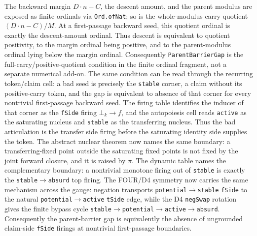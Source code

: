 \begin{theorem}
  \leanok
  The backward margin \(D\cdot n-C\), the descent amount, and the parent modulus
  are exposed as finite ordinals via \texttt{Ord.ofNat}; so is the whole-modulus
  carry quotient \((D\cdot n-C)/M\). At a first-passage backward seed, this
  quotient ordinal is exactly the descent-amount ordinal. Thus descent is
  equivalent to quotient positivity, to the margin ordinal being positive, and to
  the parent-modulus ordinal lying below the margin ordinal. Consequently
  \texttt{ParentBarrierGap} is the full-carry/positive-quotient condition in the
  finite ordinal fragment, not a separate numerical add-on. The same condition
  can be read through the recurring token/claim cell: a bad seed is precisely the
  \texttt{stable} corner, a claim without its positive-carry token, and the gap is
  equivalent to absence of that corner for every nontrivial first-passage
  backward seed. The firing table identifies the inducer of that corner as the
  \texttt{fSide} firing \(\bot_k\to f\), and the autopoiesis cell reads
  \texttt{active} as the saturating nucleus and \texttt{stable} as the transferring
  nucleus. Thus the bad articulation is the transfer side firing before the
  saturating identity side supplies the token. The abstract nuclear theorem now
  names the same boundary: a transferring-fixed point outside the saturating
  fixed points is not fixed by the joint forward closure, and it is raised by
  \(\pi\). The dynamic table names the complementary boundary: a nontrivial
  monotone firing out of \texttt{stable} is exactly the
  \texttt{stable}\(\to\)\texttt{absurd} top firing. The FOUR/D4 symmetry now carries
  the same mechanism across the gauge: negation transports
  \texttt{potential}\(\to\)\texttt{stable} \texttt{fSide} to the natural
  \texttt{potential}\(\to\)\texttt{active} \texttt{tSide} edge, while the D4
  \texttt{negSwap} rotation gives the finite bypass cycle
  \texttt{stable}\(\to\)\texttt{potential}\(\to\)\texttt{active}\(\to\)\texttt{absurd}.
  Consequently the parent-barrier gap is equivalently the absence of ungrounded
  claim-side \texttt{fSide} firings at nontrivial first-passage boundaries.
\end{theorem}
